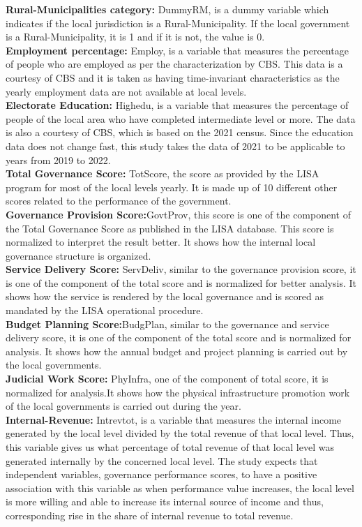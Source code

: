 \textbf{Rural-Municipalities category:} DummyRM, is a dummy variable which indicates if the local jurisdiction is a Rural-Municipality. If the local government is a Rural-Municipality, it is 1 and if it is not, the value is 0.\\
\textbf{Employment percentage:} Employ, is a variable that measures the percentage of people who are employed as per the characterization by CBS. This data is a courtesy of CBS and it is taken as having time-invariant characteristics as the yearly employment data are not available at local levels.\\
\textbf{Electorate Education:} Highedu, is a variable that measures the percentage of people of the local area who have completed intermediate level or more. The data is also a courtesy of CBS, which is based on the 2021 census. Since the education data does not change fast, this study takes the data of 2021 to be applicable to years from 2019 to 2022. \\
\textbf{Total Governance Score:} TotScore, the score as provided by the LISA program for most of the local levels yearly. It is made up of 10 different other scores related to the performance of the government.\\
\textbf{Governance Provision Score:}GovtProv, this score is one of the component of the Total Governance Score as published in the LISA database. This score is normalized to interpret the result better. It shows how the internal local governance structure is organized.\\
\textbf{Service Delivery Score:} ServDeliv, similar to the governance provision score, it is one of the component of the total score and is normalized for better analysis. It shows how the service is rendered by the local governance and is scored as mandated by the LISA operational procedure.\\ 
\textbf{Budget Planning Score:}BudgPlan,  similar to the governance and service delivery score, it is one of the component of the total score and is normalized for analysis. It shows how the annual budget and project planning is carried out by the local governments. \\
\textbf{Judicial Work Score:} PhyInfra,  one of the component of total score, it is normalized for analysis.It shows how the physical infrastructure promotion work of the local governments is carried out during the year. \\
\textbf{Internal-Revenue:} Intrevtot, is a variable that measures the internal income generated by the local level divided by the total revenue of that local level. Thus, this variable gives us what percentage of total revenue of that local level was generated internally by the concerned local level. The study expects that independent variables, governance performance scores, to have a positive association with this variable as when performance value increases, the local level is more willing and able to increase its internal source of income and thus, corresponding rise in the share of internal revenue to total revenue.\\
